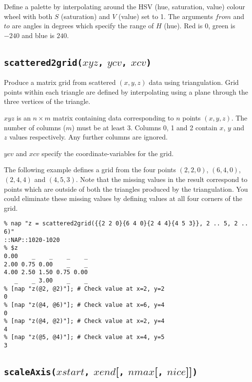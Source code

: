 Define a palette by interpolating around the HSV (hue,
  saturation, value) colour wheel with both 
$S$ (saturation) and $V$ (value) set to 1.
The arguments $\mathit{from}$ and 
$\mathit{to}$ are angles in degrees which specify the range of $H$ (hue).
Red is $0$, green is $-240$ and blue is $240$.

\subsection{\texttt{scattered2grid(}$\mathit{xyz}$\texttt{,}
$\mathit{ycv}$\texttt{,} $\mathit{xcv}$\texttt{)}}
    \label{nap-function-lib-scattered2grid}

Produce a matrix grid from scattered $(x,y,z)$ data using triangulation.
Grid points within each triangle are defined by interpolating using a plane through the three
vertices of the triangle.

$\mathit{xyz}$ is an $n \times m$ matrix containing data corresponding to 
$n$ points $(x,y,z)$. The number of columns ($m$) must be at least 3.
Columns 0, 1 and 2 contain $x$, $y$ and $z$ values respectively.
Any further columns are ignored.
 
$\mathit{ycv}$ and $\mathit{xcv}$ specify the coordinate-variables for the grid.

The following example defines a grid from the four points $(2,2,0)$, $(6,4,0)$, $(2,4,4)$
and $(4,5,3)$.
Note that the missing values in the
result correspond to points which are outside of both the triangles
produced by the triangulation. You could eliminate these missing
values by defining values at all four corners of the grid.
\begin{verbatim}
% nap "z = scattered2grid({{2 2 0}{6 4 0}{2 4 4}{4 5 3}}, 2 .. 5, 2 .. 6)"
::NAP::1020-1020
% $z
0.00    _    _    _    _
2.00 0.75 0.00    _    _
4.00 2.50 1.50 0.75 0.00
   _    _ 3.00    _    _
% [nap "z(@2, @2)"]; # Check value at x=2, y=2
0
% [nap "z(@4, @6)"]; # Check value at x=6, y=4
0
% [nap "z(@4, @2)"]; # Check value at x=2, y=4
4
% [nap "z(@5, @4)"]; # Check value at x=4, y=5
3
\end{verbatim}

\subsection{\texttt{scaleAxis(}$\mathit{xstart}$\texttt{,}
$\mathit{xend}$[\texttt{,} $\mathit{nmax}$[\texttt{,} $\mathit{nice}$]]\texttt{)}}
    \label{nap-function-lib-scaleAxis}

